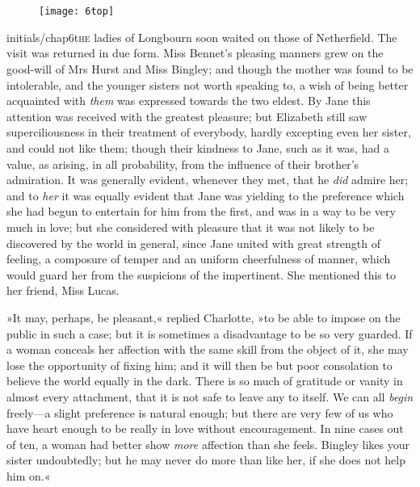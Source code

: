 \chapter[Chapter \thechapter]{}
\begin{figure}[t!]
\centering
\texttt{[image: 6top]}
\end{figure}

\lettrine[lines=6,image=true]{initials/chap6t}{he}  ladies of Longbourn soon waited on those of Netherfield. The visit was returned in due form. Miss Bennet's pleasing manners grew on the good-will of Mrs Hurst and Miss Bingley; and though the mother was found to be intolerable, and the younger sisters not worth speaking to, a wish of being better acquainted with \textit{them} was expressed towards the two eldest. By Jane this attention was received with the greatest pleasure; but Elizabeth still saw superciliousness in their treatment of everybody, hardly excepting even her sister, and could not like them; though their kindness to Jane, such as it was, had a value, as arising, in all probability, from the influence of their brother's admiration. It was generally evident, whenever they met, that he \textit{did} admire her; and to \textit{her} it was equally evident that Jane was yielding to the preference which she had begun to entertain for him from the first, and was in a way to be very much in love; but she considered with pleasure that it was not likely to be discovered by the world in general, since Jane united with great strength of feeling, a composure of temper and an uniform cheerfulness of manner, which would guard her from the suspicions of the impertinent. She mentioned this to her friend, Miss Lucas.

»It may, perhaps, be pleasant,« replied Charlotte, »to be able to impose on the public in such a case; but it is sometimes a disadvantage to be so very guarded. If a woman conceals her affection with the same skill from the object of it, she may lose the opportunity of fixing him; and it will then be but poor consolation to believe the world equally in the dark. There is so much of gratitude or vanity in almost every attachment, that it is not safe to leave any to itself. We can all \textit{begin} freely—a slight preference is natural enough; but there are very few of us who have heart enough to be really in love without encouragement. In nine cases out of ten, a woman had better show \textit{more} affection than she feels. Bingley likes your sister undoubtedly; but he may never do more than like her, if she does not help him on.«

